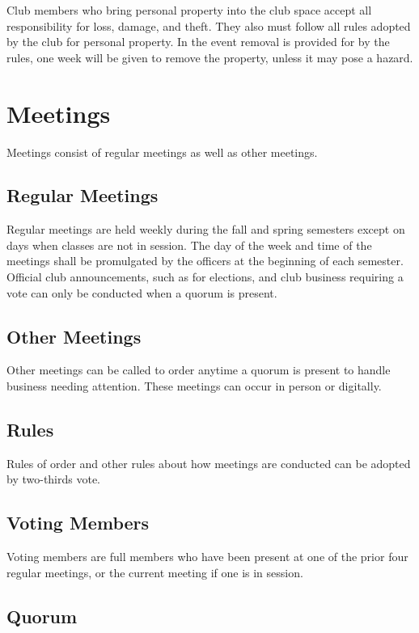 \documentclass{article}
\begin{document}
Club members who bring personal property into the club space accept all
responsibility for loss, damage, and theft. They also must follow all rules
adopted by the club for personal property. In the event removal is provided for
by the rules, one week will be given to remove the property, unless it may pose
a hazard.

\section{Meetings}

Meetings consist of regular meetings as well as other meetings.

\subsection{Regular Meetings}

Regular meetings are held weekly during the fall and spring semesters except on
days when classes are not in session. The day of the week and time of the
meetings shall be promulgated by the officers at the beginning of each semester.
Official club announcements, such as for elections, and club business requiring
a vote can only be conducted when a quorum is present.

\subsection{Other Meetings}

Other meetings can be called to order anytime a quorum is present to handle
business needing attention. These meetings can occur in person or digitally.

\subsection{Rules}

Rules of order and other rules about how meetings are conducted can be adopted
by two-thirds vote.

\subsection{Voting Members}

Voting members are full members who have been present at one of the prior four
regular meetings, or the current meeting if one is in session.

\subsection{Quorum}
\end{document}
